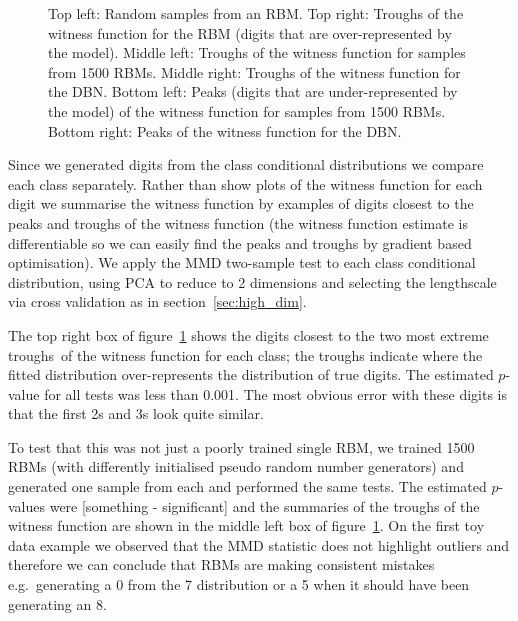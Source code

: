 \documentclass{article} %
\def\eg{e.g.\ }
\begin{document}
\begin{figure}[ht]
\caption{
Top left: Random samples from an RBM.
Top right: Troughs of the witness function for the RBM (digits that are over-represented by the model).
Middle left: Troughs of the witness function for samples from 1500 RBMs.
Middle right: Troughs of the witness function for the DBN.
Bottom left: Peaks (digits that are under-represented by the model) of the witness function for samples from 1500 RBMs.
Bottom right: Peaks of the witness function for the DBN.
}
\label{fig:digits}
\end{figure}

Since we generated digits from the class conditional distributions we compare each class separately.
Rather than show plots of the witness function for each digit we summarise the witness function by examples of digits closest to the peaks and troughs of the witness function (the witness function estimate is differentiable so we can easily find the peaks and troughs by gradient based optimisation).
We apply the MMD two-sample test to each class conditional distribution, using PCA to reduce to 2 dimensions and selecting the lengthscale via cross validation as in section~\ref{sec:high_dim}.

The top right box of figure~\ref{fig:digits} shows the digits closest to the two most extreme troughs\footnotemark~of the witness function for each class; the troughs indicate where the fitted distribution over-represents the distribution of true digits.
The estimated $p$-value for all tests was less than 0.001.
The most obvious error with these digits is that the first 2s and 3s look quite similar.

To test that this was not just a poorly trained single RBM, we trained 1500 RBMs (with differently initialised pseudo random number generators) and generated one sample from each and performed the same tests.
The estimated $p$-values were [something - significant] and the summaries of the troughs of the witness function are shown in the middle left box of figure~\ref{fig:digits}.
On the first toy data example we observed that the MMD statistic does not highlight outliers and therefore we can conclude that RBMs are making consistent mistakes \eg generating a 0 from the 7 distribution or a 5 when it should have been generating an 8.
\end{document}
